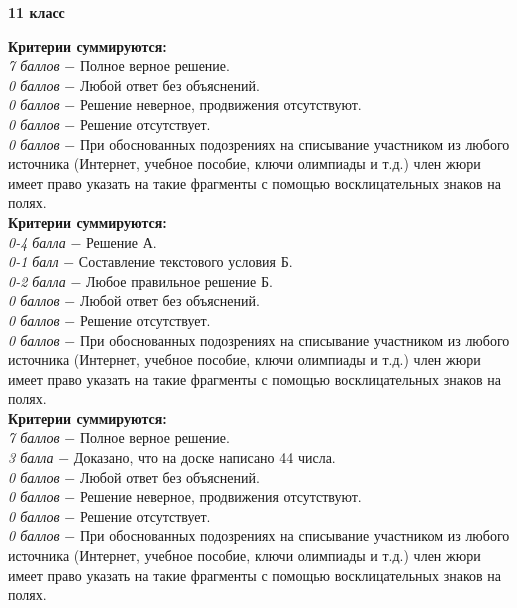 \centerline{\bf \Huge 11 класс}

 \textbf{Критерии суммируются:} \\
\textit{7 баллов} $-$ Полное верное решение.\\
\textit{0 баллов} $-$ Любой ответ без объяснений.\\
\textit{0 баллов} $-$ Решение неверное, продвижения отсутствуют.\\
\textit{0 баллов} $-$ Решение отсутствует.\\
\textit{0 баллов} $-$ При обоснованных подозрениях на списывание участником из любого источника (Интернет, учебное пособие, ключи олимпиады и т.д.) член жюри имеет право указать на такие фрагменты с помощью восклицательных знаков на полях. \\

 \textbf{Критерии суммируются:} \\
\textit{0-4 балла} $-$ Решение А.\\
\textit{0-1 балл} $-$ Составление текстового условия Б.\\
\textit{0-2 балла} $-$ Любое правильное решение Б.\\
\textit{0 баллов} $-$ Любой ответ без объяснений.\\
\textit{0 баллов} $-$ Решение отсутствует.\\
\textit{0 баллов} $-$ При обоснованных подозрениях на списывание участником из любого источника (Интернет, учебное пособие, ключи олимпиады и т.д.) член жюри имеет право указать на такие фрагменты с помощью восклицательных знаков на полях. \\
 \textbf{Критерии суммируются:} \\
\textit{7 баллов} $-$ Полное верное решение.\\
\textit{3 балла} $-$ Доказано, что на доске написано 44 числа.\\
\textit{0 баллов} $-$ Любой ответ без объяснений.\\
\textit{0 баллов} $-$ Решение неверное, продвижения отсутствуют.\\
\textit{0 баллов} $-$ Решение отсутствует.\\
\textit{0 баллов} $-$ При обоснованных подозрениях на списывание участником из любого источника (Интернет, учебное пособие, ключи олимпиады и т.д.) член жюри имеет право указать на такие фрагменты с помощью восклицательных знаков на полях. \\



